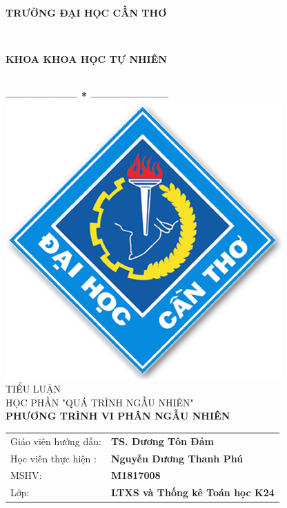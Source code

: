 \documentclass[14pt,a4paper]{article}
\numberwithin{equation}{section}
\begin{document}
\renewcommand\thesection{\Roman{section}}
\renewcommand\thesubsection{\arabic{subsection}}
\renewcommand\thesubsubsection{\thesubsection.\arabic{subsubsection}}
\thispagestyle{empty}
\thisfancypage{
\setlength{\fboxsep}{2pt}
\fbox}{} 
\begin{center}
\begin{large}
\textbf{\\TRƯỜNG ĐẠI HỌC CẦN THƠ}
\end{large} \\
\begin{large}
\textbf{KHOA KHOA HỌC TỰ NHIÊN}
\end{large} \\
\textbf{--------------------  *  ---------------------}\\[1cm]
\includegraphics{logo-ctu} \\[2cm]
{\fontsize{18pt}{1}\selectfont TIỂU LUẬN\\HỌC PHẦN "QUÁ TRÌNH NGẪU NHIÊN"}\\[2cm]
{\fontsize{22pt}{1}\selectfont \textbf{PHƯƠNG TRÌNH VI PHÂN NGẪU NHIÊN}}\\[3cm]
\end{center}


\indent \begin{tabular}{ll}
Giáo viên hướng dẫn: &\textbf{TS. Dương Tôn Đảm}\\
Học viên thực hiện : &\textbf{Nguyễn Dương Thanh Phú} \\
MSHV: &\textbf{M1817008}\\
Lớp: &\textbf{LTXS và Thống kê Toán học K24}
\end{tabular}
\end{document}
